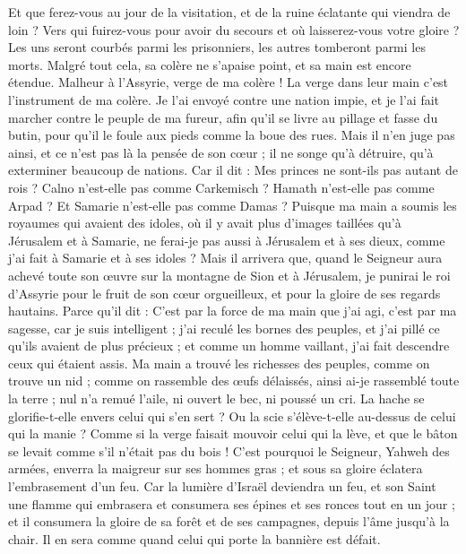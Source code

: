 \begin{multicols}{2}
Et que ferez-vous au jour de la visitation, et de la ruine éclatante qui viendra de loin ? Vers qui fuirez-vous pour avoir du secours et où laisserez-vous votre gloire ?
Les uns seront courbés parmi les prisonniers, les autres tomberont parmi les morts. Malgré tout cela, sa colère ne s'apaise point, et sa main est encore étendue.
Malheur à l'Assyrie, verge de ma colère ! La verge dans leur main c'est l'instrument de ma colère.
Je l'ai envoyé contre une nation impie, et je l'ai fait marcher contre le peuple de ma fureur, afin qu'il se livre au pillage et fasse du butin, pour qu'il le foule aux pieds comme la boue des rues.
Mais il n'en juge pas ainsi, et ce n'est pas là la pensée de son cœur ; il ne songe qu'à détruire, qu'à exterminer beaucoup de nations.
Car il dit : Mes princes ne sont-ils pas autant de rois ?
Calno n'est-elle pas comme Carkemisch ? Hamath n'est-elle pas comme Arpad ? Et Samarie n'est-elle pas comme Damas ?
Puisque ma main a soumis les royaumes qui avaient des idoles, où il y avait plus d'images taillées qu'à Jérusalem et à Samarie,
ne ferai-je pas aussi à Jérusalem et à ses dieux, comme j'ai fait à Samarie et à ses idoles ?
Mais il arrivera que, quand le Seigneur aura achevé toute son œuvre sur la montagne de Sion et à Jérusalem, je punirai le roi d'Assyrie pour le fruit de son cœur orgueilleux, et pour la gloire de ses regards hautains.
Parce qu'il dit : C'est par la force de ma main que j'ai agi, c'est par ma sagesse, car je suis intelligent ; j'ai reculé les bornes des peuples, et j'ai pillé ce qu'ils avaient de plus précieux ; et comme un homme vaillant, j'ai fait descendre ceux qui étaient assis.
Ma main a trouvé les richesses des peuples, comme on trouve un nid ; comme on rassemble des œufs délaissés, ainsi ai-je rassemblé toute la terre ; nul n'a remué l'aile, ni ouvert le bec, ni poussé un cri.
La hache se glorifie-t-elle envers celui qui s'en sert ? Ou la scie s'élève-t-elle au-dessus de celui qui la manie ? Comme si la verge faisait mouvoir celui qui la lève, et que le bâton se levait comme s'il n'était pas du bois !
C'est pourquoi le Seigneur, Yahweh des armées, enverra la maigreur sur ses hommes gras ; et sous sa gloire éclatera l'embrasement d'un feu.
Car la lumière d'Israël deviendra un feu, et son Saint une flamme qui embrasera et consumera ses épines et ses ronces tout en un jour ;
et il consumera la gloire de sa forêt et de ses campagnes, depuis l'âme jusqu'à la chair. Il en sera comme quand celui qui porte la bannière est défait.

\end{multicols}
